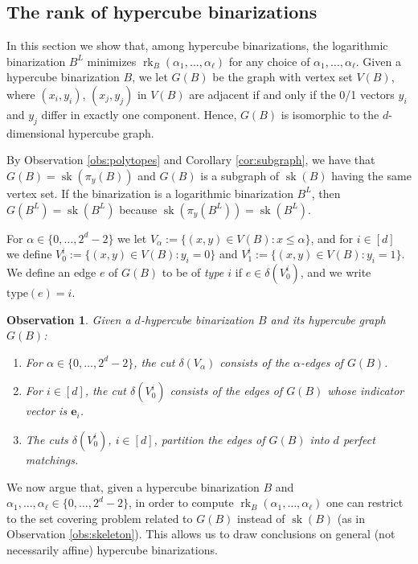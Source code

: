 \documentclass[11pt,a4paper]{article}
\newtheorem{observation}[theorem]{Observation}
\newcommand{\type}{\mathrm{type}}
\newcommand{\1}{\textbf{1}}
\newcommand{\rk}{\operatorname{rk}}
\newcommand{\sk}{\operatorname{sk}}
\newcommand\marco[1]{\textcolor{red}{\textbf{ MDS:  #1}}}
\begin{document}
\subsection{The rank of hypercube binarizations} \label{sec:hypercube}


In this section we  show that, among hypercube binarizations, the logarithmic binarization $B^L$ minimizes $\rk_B(\alpha_1,\dots,\alpha_\ell)$ for any choice of $\alpha_1,\dots,\alpha_\ell$.
 Given a hypercube binarization $B$, we let $G(B)$ be the graph with vertex set $V(B)$, where $(x_i,y_i)$, $(x_j,y_j)$ in $V(B)$ are adjacent if and only if the 0/1 vectors $y_i$ and $y_j$ differ in exactly one component. Hence, $G(B)$ is isomorphic to the $d$-dimensional hypercube graph.
 
By Observation \ref{obs:polytopes} and Corollary \ref{cor:subgraph}, we have that $G(B)=\sk(\pi_y(B))$ and $G(B)$ is a subgraph of $\sk(B)$ having the same vertex set. If the binarization is a logarithmic binarization $B^L$, then  $G(B^L)=\sk(B^L)$ because $\sk(\pi_y(B^L))=\sk(B^L)$.

 


For $\alpha\in \{0,\dots,2^d-2\}$ we let $V_{\alpha}:=\{(x,y)\in V(B):x\le \alpha\}$, and for $i\in [d]$ we define $V_0^i:=\{(x,y)\in V(B): y_i=0\}$ and $V_1^i:=\{(x,y)\in V(B): y_i=1\}$. We define an edge $e$ of $G(B)$ to be of {\em type $i$} if $e\in \delta(V_0^i)$, and we write $\type(e)=i$. 






\begin{observation}\label{obs:hypercube}
Given a $d$-hypercube binarization $B$ and  its hypercube graph $G(B)$: \begin{enumerate}
    \item For $\alpha\in \{0,\dots,2^d-2\}$, the cut $\delta(V_{\alpha})$ consists of the $\alpha$-edges of $G(B)$.
\item For $i\in [d]$, the cut $\delta(V^i_0)$ consists of the edges of $G(B)$ whose indicator vector is $\mathbf{e}_i$. \item The cuts $\delta(V^i_0)$, $i\in [d]$, partition the edges of $G(B)$ into $d$ perfect matchings.
\end{enumerate}
\end{observation}

We now argue that, given a hypercube binarization $B$ and $\alpha_1,\dots,\alpha_\ell\in\{0,\dots, 2^d-2\}$, in order to compute $\rk_B(\alpha_1,\dots,\alpha_\ell)$ one can restrict to the set covering problem related to $G(B)$ instead of $\sk(B)$ (as in Observation \ref{obs:skeleton}).   %
This allows us to draw conclusions on general (not necessarily affine) hypercube binarizations.
\end{document}
